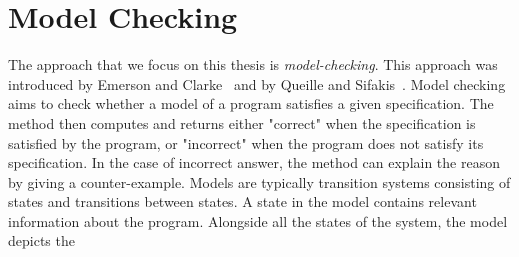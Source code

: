 \chapter{Model Checking}
\label{section:model:checking}
%
%
%

The approach that we focus on this thesis is
\emph{model-checking}.
%
%
This approach was introduced by Emerson and Clarke~\cite{CE82} and by Queille and Sifakis~\cite{QS82}. 
Model checking aims to check whether a model of a program satisfies a given specification.
 The method then computes and returns either "correct" when the specification is satisfied by the program, or "incorrect" when the program does not satisfy its specification. In the case of incorrect answer, the method can explain the reason by giving a counter-example.
Models are typically transition systems consisting of states and transitions between states.
A state in the model contains relevant information about the program.
Alongside all the states of the system, the model depicts the
